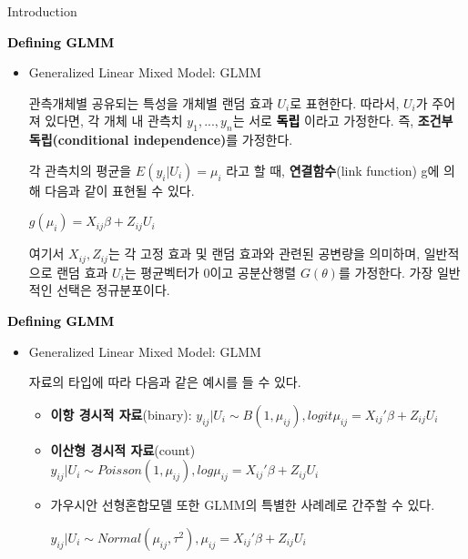 \documentclass[9pt, xelatex]{beamer}
\begin{document}
{\begin{frame}[allowframebreaks]{Introduction}
\begin{itemize}
	\end{itemize}
		\pagebreak
		
		
		\textcolor{black}{\textbf{Defining GLMM}}
		\vspace{2mm}
	\begin{itemize}
			\item Generalized Linear Mixed Model: GLMM
			\vspace{3mm}
			
			관측개체별 공유되는 특성을 개체별 랜덤 효과 $U_{i}$로 표현한다. 따라서, $U_{i}$가 주어져 있다면, 각 개체 내 관측치 $ y_{1},...,y_{n} $는 서로 \textcolor{black}{\textbf{독립}} 이라고 가정한다. 즉, \textbf{조건부 독립(conditional independence)}를 가정한다.
			\vspace{2mm}
			
			 각 관측치의 평균을 $ E(y_{i}|U_{i})=\mu_{i}$ 라고 할 때, \textbf{연결함수}(link function) g에 의해 다음과 같이 표현될 수 있다.
			 
			\begin{center} $g(\mu_{i})=X_{ij}\beta+Z_{ij}U_{i}$\end{center}
			\vspace{2mm}
			
			여기서 $X_{ij}, Z_{ij}$는 각 고정 효과 및 랜덤 효과와 관련된 공변량을 의미하며, 일반적으로 랜덤 효과 $U_{i}$는 평균벡터가 0이고 공분산행렬 $G(\theta)$를 가정한다. 가장 일반적인 선택은 정규분포이다. 
			\vspace{2mm}
						
					
			
	\end{itemize}	
		\pagebreak
		
		
		\textcolor{black}{\textbf{Defining GLMM}}
		\vspace{2mm}
	\begin{itemize}
			\item Generalized Linear Mixed Model: GLMM
			\vspace{3mm}
			
			자료의 타입에 따라 다음과 같은 예시를 들 수 있다.
			
			\begin{itemize}
				\item \textbf{이항 경시적 자료}(binary): $y_{ij}|U_{i} \sim B(1,\mu_{ij}), logit\mu_{ij}=X_{ij}'\beta+Z_{ij}U_{i}$
				\item \textbf{이산형 경시적 자료}(count) $y_{ij}|U_{i} \sim Poisson(1,\mu_{ij}), log\mu_{ij}=X_{ij}'\beta+Z_{ij}U_{i}$
				\item 가우시안 선형혼합모델 또한 GLMM의 특별한 사례례로 간주할 수 있다.
				\begin{center} $y_{ij}|U_{i} \sim Normal(\mu_{ij},\tau^{2}), \mu_{ij}=X_{ij}'\beta+Z_{ij}U_{i}$
				\end{center}
			\end{itemize}
			\vspace{2mm}
			

\end{itemize}
\end{frame}}
\end{document}
